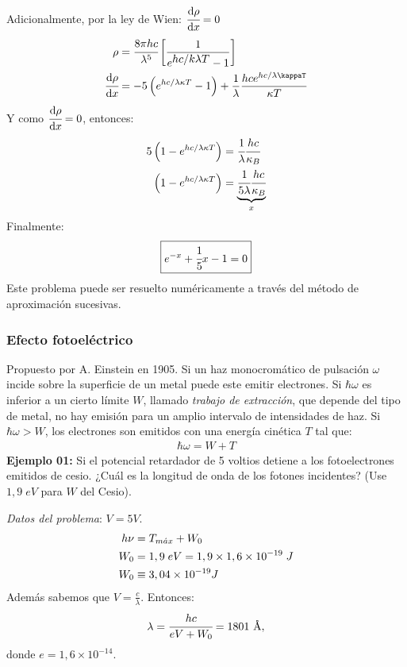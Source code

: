 \documentclass[../main]{subfiles}
\begin{document}
\begin{multicols}{2}
\begin{align}
\end{align}
Adicionalmente, por la ley de Wien: $\displaystyle \cfrac{\text{d}\rho}{\text{d}x}=0$
\begin{align}
    \rho&=\cfrac{8\pi hc}{\lambda^5}\left[\frac{1}{e^{\displaystyle hc/k\lambda T}-1}\right]\\
    \cfrac{\text{d}\rho}{\text{d}x}&=-5 \left(e^{hc/\lambda \kappa T}-1\right)+\frac{1}{\lambda}\frac{hc e^{hc/\lambda \kappaT}}{\kappa T}
\end{align}
Y como $\displaystyle \cfrac{\text{d}\rho}{\text{d}x}=0$, entonces:
\begin{align}
    5\left(1-e^{hc/\lambda \kappa T}\right)&=\cfrac{1}{\lambda}\cfrac{hc}{\kappa_B}\\
    \left(1-e^{hc/\lambda \kappa T}\right)&=\underbrace{\cfrac{1}{5\lambda}\cfrac{hc}{\kappa_B}}_{x}
\end{align}
Finalmente:
\begin{align}
    \boxed{e^{-x}+\cfrac{1}{5}x-1=0}
\end{align}
Este problema puede ser resuelto numéricamente a través del método de aproximación sucesivas.

\subsubsection{Efecto fotoeléctrico}
Propuesto por A. Einstein en 1905. Si un haz monocromático de pulsación $\omega$ incide sobre la superficie de un metal puede este emitir electrones. Si $\hbar\omega$ es inferior a un cierto límite $W$, llamado \textit{trabajo de extracción}, que depende del tipo de metal, no hay emisión para un amplio intervalo de intensidades de haz. Si $\hbar\omega > W$, los electrones son emitidos con una energía cinética $T$ tal que:
\begin{align}
    \hbar\omega = W + T
\end{align}
\textbf{Ejemplo 01:} Si el potencial retardador de 5 voltios detiene a los fotoelectrones emitidos de cesio. ¿Cuál es la longitud de onda de los fotones incidentes? (Use $1,9\;eV$ para $W$ del Cesio).

\textit{Datos del problema}: $V=5V$.
\begin{align}
    h\nu&=T_{m\Acute{a}x}+W_0\\
    W_0&=1,9\; eV=1,9\times 1,6\times 10^{-19}\;J\\
    W_0&\equiv 3,04 \times 10^{-19} J
\end{align}
Además sabemos que $V=\displaystyle\frac{c}{\lambda}$. Entonces:
\begin{align}
    \lambda=\cfrac{hc}{eV+W_0}=1801\text{ \normalfont \AA},
\end{align}
donde $e=1,6\times 10^{-14}$.


\end{multicols}
\end{document}
